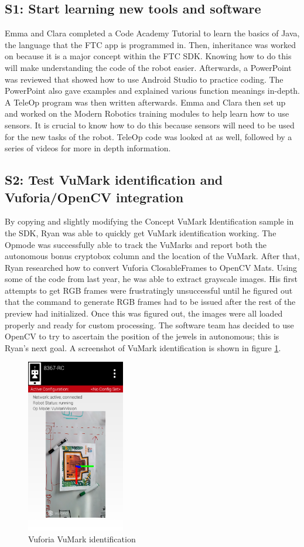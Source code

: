 \documentclass{article}
\begin{document}
\subsection{S1: Start learning new tools and software}

Emma and Clara completed a Code Academy Tutorial to learn the basics of Java, the language that the FTC app is programmed in. Then, inheritance was worked on because it is a major concept within the FTC SDK. Knowing how to do this will make understanding the code of the robot easier. Afterwards, a PowerPoint was reviewed that showed how to use Android Studio to practice coding.  The PowerPoint also gave examples and explained various function meanings in-depth. A TeleOp program was then written afterwards. Emma and Clara then set up and worked on the Modern Robotics training modules to help learn how to use sensors. It is crucial to know how to do this because sensors will need to be used for the new tasks of the robot. TeleOp code was looked at as well, followed by a series of videos for more in depth information.

\subsection{S2: Test VuMark identification and Vuforia/OpenCV integration}

By copying and slightly modifying the Concept VuMark Identification sample in the SDK, Ryan was able to quickly get VuMark identification working. The Opmode was successfully able to track the VuMarks and report both the autonomous bonus cryptobox column and the location of the VuMark. After that, Ryan researched how to convert Vuforia ClosableFrames to OpenCV Mats. Using some of the code from last year, he was able to extract grayscale images. His first attempts to get RGB frames were frustratingly unsuccessful until he figured out that the command to generate RGB frames had to be issued after the rest of the preview had initialized. Once this was figured out, the images were all loaded properly and ready for custom processing. The software team has decided to use OpenCV to try to ascertain the position of the jewels in autonomous; this is Ryan's next goal. A screenshot of VuMark identification is shown in figure \ref{fig:vumark}.
\begin{figure}[h]
    \centering
    \includegraphics[width=.6\textwidth,height=3in,keepaspectratio]{01/images/vumark.png}
    \caption{Vuforia VuMark identification}
    \label{fig:vumark}
\end{figure}
\end{document}
